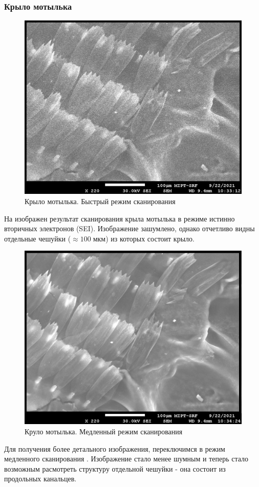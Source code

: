 \documentclass[a4paper,12pt]{article}
\theoremstyle{plain} %
\theoremstyle{definition} %
\theoremstyle{remark} %
\newcommand{\s}[0]{
	\;	
}
\newcommand{\picref}[1]{
	\text{рис(\ref{#1})}
}
\begin{document}
\subsubsection{Крыло мотылька}
\begin{figure}[h!]
	\centering
	\includegraphics[scale=1.3]{pic3.jpg}
	\caption{Крыло мотылька. Быстрый режим сканирования}
	\label{pic3}
\end{figure}
На \picref{pic3} изображен результат сканирования крыла мотылька в режиме истинно вторичных электронов (SEI). Изображение зашумлено, однако отчетливо видны отдельные чешуйки ($ \approx 100\s мкм $) из которых состоит крыло.
\begin{figure}[h!]
	\centering
	\includegraphics[scale=1.3]{pic4.jpg}
	\caption{Круло мотылька. Медленный режим сканирования}
	\label{pic4}
\end{figure}
Для получения более детального изображения, переключимся в режим медленного сканирования \picref{pic4}. Изображение стало менее шумным и теперь стало возможным расмотреть структуру отдельной чешуйки - она состоит из продольных канальцев.
\end{document}
